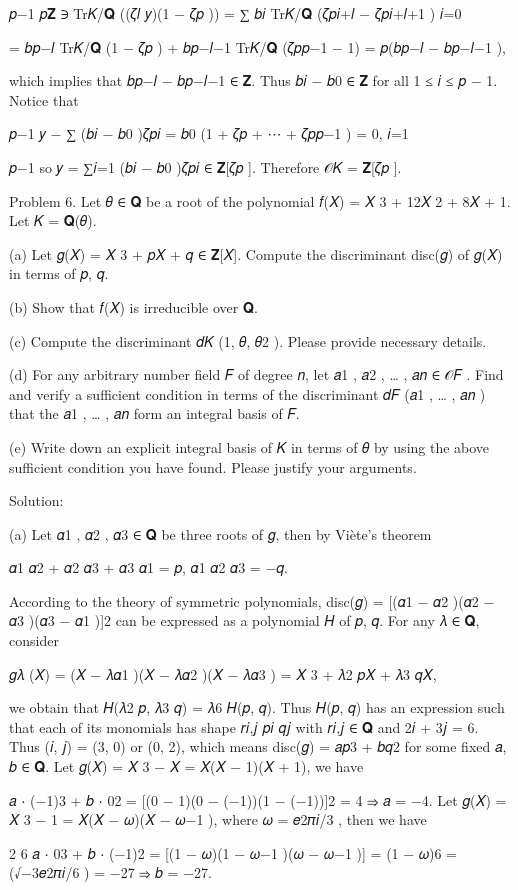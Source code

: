 \documentclass[UTF8,12pt]{ctexart}
\begin{document}
𝑝−1 𝑝𝐙 ∋ Tr𝐾/𝐐 ((𝜁𝑙 𝑦)(1 − 𝜁𝑝 )) = ∑ 𝑏𝑖 Tr𝐾/𝐐 (𝜁𝑝𝑖+𝑙 − 𝜁𝑝𝑖+𝑙+1 ) 𝑖=0

= 𝑏𝑝−𝑙 Tr𝐾/𝐐 (1 − 𝜁𝑝 ) + 𝑏𝑝−𝑙−1 Tr𝐾/𝐐 (𝜁𝑝𝑝−1 − 1) = 𝑝(𝑏𝑝−𝑙 − 𝑏𝑝−𝑙−1 ),

which implies that 𝑏𝑝−𝑙 − 𝑏𝑝−𝑙−1 ∈ 𝐙. Thus 𝑏𝑖 − 𝑏0 ∈ 𝐙 for all 1 ≤ 𝑖 ≤ 𝑝 − 1. Notice that

𝑝−1 𝑦 − ∑ (𝑏𝑖 − 𝑏0 )𝜁𝑝𝑖 = 𝑏0 (1 + 𝜁𝑝 + ⋯ + 𝜁𝑝𝑝−1 ) = 0, 𝑖=1

𝑝−1 so 𝑦 = ∑𝑖=1 (𝑏𝑖 − 𝑏0 )𝜁𝑝𝑖 ∈ 𝐙[𝜁𝑝 ]. Therefore 𝒪𝐾 = 𝐙[𝜁𝑝 ].

Problem 6. Let 𝜃 ∈ 𝐐 be a root of the polynomial 𝑓(𝑋) = 𝑋 3 + 12𝑋 2 + 8𝑋 + 1. Let 𝐾 = 𝐐(𝜃).

(a) Let 𝑔(𝑋) = 𝑋 3 + 𝑝𝑋 + 𝑞 ∈ 𝐙[𝑋]. Compute the discriminant disc(𝑔) of 𝑔(𝑋) in terms of 𝑝, 𝑞.

(b) Show that 𝑓(𝑋) is irreducible over 𝐐.

(c) Compute the discriminant 𝑑𝐾 (1, 𝜃, 𝜃2 ). Please provide necessary details.

(d) For any arbitrary number field 𝐹 of degree 𝑛, let 𝑎1 , 𝑎2 , … , 𝑎𝑛 ∈ 𝒪𝐹 . Find and verify a sufficient condition in terms of the discriminant 𝑑𝐹 (𝑎1 , … , 𝑎𝑛 ) that the 𝑎1 , … , 𝑎𝑛 form an integral basis of 𝐹.

(e) Write down an explicit integral basis of 𝐾 in terms of 𝜃 by using the above sufficient condition you have found. Please justify your arguments.

Solution:

(a) Let 𝛼1 , 𝛼2 , 𝛼3 ∈ 𝐐 be three roots of 𝑔, then by Viète’s theorem

𝛼1 𝛼2 + 𝛼2 𝛼3 + 𝛼3 𝛼1 = 𝑝, 𝛼1 𝛼2 𝛼3 = −𝑞.

According to the theory of symmetric polynomials, disc(𝑔) = [(𝛼1 − 𝛼2 )(𝛼2 − 𝛼3 )(𝛼3 − 𝛼1 )]2 can be expressed as a polynomial 𝐻 of 𝑝, 𝑞. For any 𝜆 ∈ 𝐐, consider

𝑔𝜆 (𝑋) = (𝑋 − 𝜆𝛼1 )(𝑋 − 𝜆𝛼2 )(𝑋 − 𝜆𝛼3 ) = 𝑋 3 + 𝜆2 𝑝𝑋 + 𝜆3 𝑞𝑋,

we obtain that 𝐻(𝜆2 𝑝, 𝜆3 𝑞) = 𝜆6 𝐻(𝑝, 𝑞). Thus 𝐻(𝑝, 𝑞) has an expression such that each of its monomials has shape 𝑟𝑖,𝑗 𝑝𝑖 𝑞𝑗 with 𝑟𝑖,𝑗 ∈ 𝐐 and 2𝑖 + 3𝑗 = 6. Thus (𝑖, 𝑗) = (3, 0) or (0, 2), which means disc(𝑔) = 𝑎𝑝3 + 𝑏𝑞2 for some fixed 𝑎, 𝑏 ∈ 𝐐. Let 𝑔(𝑋) = 𝑋 3 − 𝑋 = 𝑋(𝑋 − 1)(𝑋 + 1), we have

𝑎 ⋅ (−1)3 + 𝑏 ⋅ 02 = [(0 − 1)(0 − (−1))(1 − (−1))]2 = 4 ⇒ 𝑎 = −4. Let 𝑔(𝑋) = 𝑋 3 − 1 = 𝑋(𝑋 − 𝜔)(𝑋 − 𝜔−1 ), where 𝜔 = 𝑒2𝜋𝑖/3 , then we have

2 6 𝑎 ⋅ 03 + 𝑏 ⋅ (−1)2 = [(1 − 𝜔)(1 − 𝜔−1 )(𝜔 − 𝜔−1 )] = (1 − 𝜔)6 = (√−3𝑒2𝜋𝑖/6 ) = −27 ⇒ 𝑏 = −27.
\end{document}
